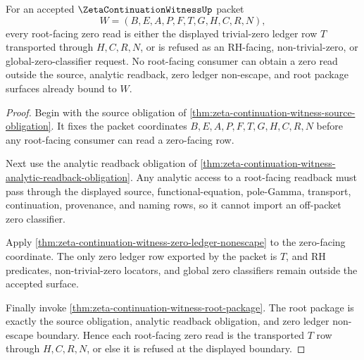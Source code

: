 \begin{theorem}
\label{thm:zeta-continuation-witness-root-zero-ledger-totality}
For an accepted $\ZetaContinuationWitnessUp$ packet
$$
W=(B,E,A,P,F,T,G,H,C,R,N),
$$
every root-facing zero read is either the displayed trivial-zero ledger row
$T$ transported through $H,C,R,N$, or is refused as an RH-facing,
non-trivial-zero, or global-zero-classifier request. No root-facing consumer
can obtain a zero read outside the source, analytic readback, zero ledger
non-escape, and root package surfaces already bound to $W$.
\end{theorem}
\begin{proof}
Begin with the source obligation of
\autoref{thm:zeta-continuation-witness-source-obligation}. It fixes the packet
coordinates $B,E,A,P,F,T,G,H,C,R,N$ before any root-facing consumer can read a
zero-facing row.

Next use the analytic readback obligation of
\autoref{thm:zeta-continuation-witness-analytic-readback-obligation}. Any
analytic access to a root-facing readback must pass through the displayed
source, functional-equation, pole-Gamma, transport, continuation, provenance,
and naming rows, so it cannot import an off-packet zero classifier.

Apply \autoref{thm:zeta-continuation-witness-zero-ledger-nonescape} to the
zero-facing coordinate. The only zero ledger row exported by the packet is
$T$, and RH predicates, non-trivial-zero locators, and global zero classifiers
remain outside the accepted surface.

Finally invoke \autoref{thm:zeta-continuation-witness-root-package}. The root
package is exactly the source obligation, analytic readback obligation, and
zero ledger non-escape boundary. Hence each root-facing zero read is the
transported $T$ row through $H,C,R,N$, or else it is refused at the displayed
boundary.
\end{proof}
